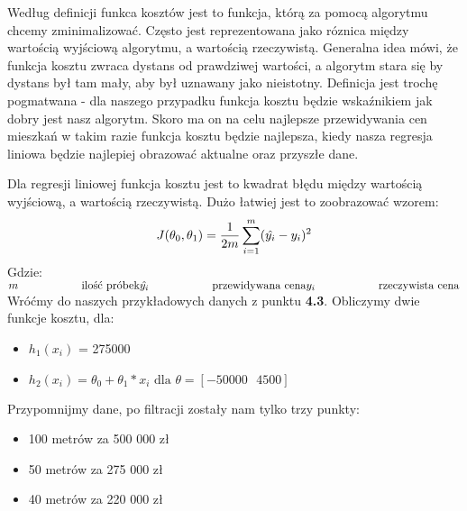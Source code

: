 Według definicji funkca kosztów jest to funkcja, którą za pomocą algorytmu chcemy zminimalizować. Często jest reprezentowana jako róznica między wartością wyjściową algorytmu, a wartością rzeczywistą. Generalna idea mówi, że funkcja kosztu zwraca dystans od prawdziwej wartości, a algorytm stara się by dystans był tam mały, aby był uznawany jako nieistotny.
\newline
\noindent
Definicja jest trochę pogmatwana - dla naszego przypadku funkcja kosztu będzie wskaźnikiem jak dobry jest nasz algorytm. Skoro ma on na celu najlepsze przewidywania cen mieszkań w takim razie funkcja kosztu będzie najlepsza, kiedy nasza regresja liniowa będzie najlepiej obrazować aktualne oraz przyszłe dane.


\noindent
Dla regresji liniowej funkcja kosztu jest to kwadrat błędu między wartością wyjściową, a wartością rzeczywistą. Dużo łatwiej jest to zoobrazować wzorem:
\newline
\newline
\noindent
\large
$$
	J(\theta_{0}, \theta_{1}) = \frac{1}{2m}\sum_{i=1}^{m}(\hat{y_{i}}-y_{i})^{2} \\
$$
\normalsize
Gdzie: \\
\(
	m \hspace{2cm}\textrm{ilość próbek} \\
	\hat{y_{i}} \hspace{2cm}\textrm{przewidywana cena} \\
	y_{i} \hspace{2cm}\textrm{rzeczywista cena} \\
\)
\newline
\noindent
Wróćmy do naszych przykładowych danych z punktu \textbf{4.3}. Obliczymy dwie funkcje kosztu, dla:
\begin{itemize}

  \item $h_{1}(x_{i})$ = 275000
  \item $h_{2}(x_{i}) = \theta_{0} + \theta_{1}*x_{i} \textrm{ dla } \theta = [-50000\textrm{  }4500]$

\end{itemize}
Przypomnijmy dane, po filtracji zostały nam tylko trzy punkty:
\begin{itemize}

  \item 100 metrów za 500 000 zł
  \item 50 metrów za 275 000 zł
  \item 40 metrów za 220 000 zł

\end{itemize}
